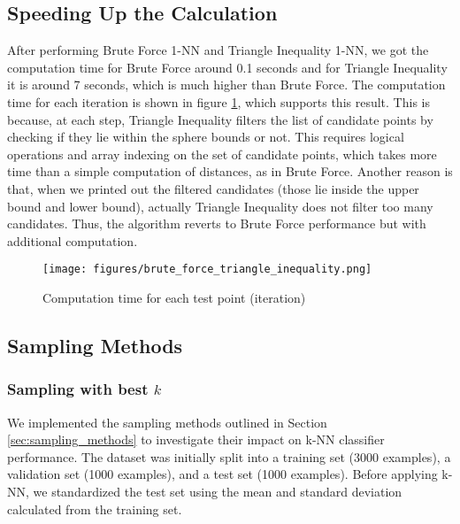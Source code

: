 \documentclass{article}
\theoremstyle{plain}
\theoremstyle{definition}
\theoremstyle{remark}
\begin{document}
\subsection{Speeding Up the Calculation}

After performing Brute Force 1-NN and Triangle Inequality 1-NN, we got the computation time for Brute Force around 0.1 seconds and for Triangle Inequality it is around 7 seconds, which is much higher than Brute Force. The computation time for each iteration is shown in figure \ref{fig:brute_force_triangle_inequality}, which supports this result. This is because, at each step, Triangle Inequality filters the list of candidate points by checking if they lie within the sphere bounds or not. This requires logical operations and array indexing on the set of candidate points, which takes more time than a simple computation of distances, as in Brute Force. Another reason is that, when we printed out the filtered candidates (those lie inside the upper bound and lower bound), actually Triangle Inequality does not filter too many candidates. Thus, the algorithm reverts to Brute Force performance but with additional computation.

\begin{figure}[h]
    \centering
    \begin{minipage}[t]{0.8\linewidth}
        \centering
        \texttt{[image: figures/brute\_force\_triangle\_inequality.png]}
        \caption{Computation time for each test point (iteration)}
        \label{fig:brute_force_triangle_inequality}
    \end{minipage}%
\end{figure}

\subsection{Sampling Methods}
    \label{sec:sampling_results}
    \subsubsection{Sampling with best $k$}
        We implemented the sampling methods outlined in Section \ref{sec:sampling_methods} to investigate their impact on k-NN classifier performance. The dataset was initially split into a training set (3000 examples), a validation set (1000 examples), and a test set (1000 examples). Before applying k-NN, we standardized the test set using the mean and standard deviation calculated from the training set.
\end{document}
